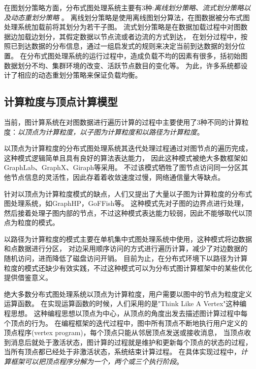 在图划分策略方面，分布式图处理系统主要有3种:\textit{离线划分策略\cite{metis}、流式划分策略\cite{tsourakakis2014fennel}以及动态重划分策略\cite{kumar2017graphsteal} }。
离线划分策略是使用离线图划分算法，在图数据被分布式图处理系统加载前将其划分为若干子图。
流式划分策略是在数据加载过程中对图数据边加载边划分，其假定数据以节点流或者边流的方式到达，
在划分过程中，按照已到达数据的分布信息，通过一组启发式的规则来决定当前到达数据的划分位置。
在分布式图处理系统的运行过程中，造成负载不均的因素有很多，括初始图数据划分不均、集群环境的改变、活跃节点数目的变化等。
为此，许多系统都设计了相应的动态重划分策略来保证负载均衡。

\subsection{计算粒度与顶点计算模型}

当前，图计算系统在对图数据进行遍历计算的过程中主要使用了3种不同的计算粒度：\textit{以顶点为计算粒度，以子图为计算粒度和以路径为计算粒度}。
    
以顶点为计算粒度的分布式图处理系统其迭代处理过程通过对图节点的遍历完成，这种模式逻辑简单且具有良好的算法表达能力，
因此这种模式被绝大多数框架如GraphLab\cite{Low@12}、GraphX\cite{Gonzalez@OSDI14}、Giraph\cite{Avery@HS11}等采用。
不过该模式牺牲了图节点访问同一分区其他节点信息的灵活性，因此存着着收敛速度过慢，网络通信量大等缺点。

针对以顶点为计算粒度模式的缺点，人们又提出了大量以子图为计算粒度的分布式图处理系统，如GraphHP\cite{su2016graphhp}，GoFFish\cite{goffish}等。
这种模式先对子图的边界点进行处理，然后接着处理子图内部的节点，不过这种模式表达能力较弱，因此不能够取代以顶点为粒度的模式。

以路径为计算粒度的模式主要在单机集中式图处理系统中使用，这种模式将边数据和点数据进行分区，
对边采用顺序访问的方式进行遍历计算，减少了对边数据的随机访问，进而降低了磁盘访问开销。
目前为止，在分布式环境下以路径为计算粒度的模式还缺少有效实践，不过这种模式可以为分布式图计算框架中的某些优化提供借鉴意义。

绝大多数分布式图处理系统以顶点为计算粒度，用户需要以图中的节点为粒度定义运算函数。
在实现运算函数的时候，人们采用的是"Think Like A Vertex"\cite{TLV}这种编程思想。
这种编程思想以顶点为中心，从顶点的角度出发去描述图计算过程中每个顶点的行为。
在编程框架的迭代过程中，图中所有顶点不断地执行用户定义的顶点程序(vertex program)，每个顶点只能从邻居顶点发送或接收消息，
当顶点收到消息后就处于激活状态，图计算的过程就是维护和更新每个顶点的状态的过程，当所有顶点都已经处于非激活状态，系统结束计算过程。
在具体实现过程中，\textit{计算框架可以把顶点程序分解为一个，两个或三个执行阶段}。

